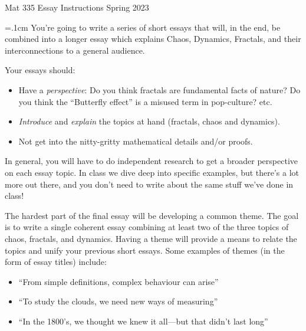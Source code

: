 \documentclass[12pt]{article}
\def\mydot{\textcolor{deepblue}{\rule{1ex}{1ex}}}
\newlength\sidebarwidth
\begin{document}
	{
		\begin{minipage}[t]{\textwidth}
			\color{myblue}\sc %
			{\huge Mat 335 Essay Instructions}
			\hfill Spring 2023

			\vspace{-8pt}
			\color{myblue}{\rule{\columnwidth}{3pt}}

			\vspace{.2cm}
		\end{minipage}
	}

	\vspace{.2cm}
	

	\small
	\hspace{\sidebarwidth}\begin{minipage}[t]{\textwidth - \sidebarwidth}
	{
		\parskip=.1cm
		You’re going to write a series of short essays that
		will, in the end, be combined into a longer essay
		which explains Chaos, Dynamics, Fractals, and their
		interconnections to a general audience.


		Your essays should:
		\vspace{-.4cm}
		\begin{itemize}[leftmargin=1cm, itemsep=0ex, parsep=.5ex, labelindent=-4ex, label={\mydot}]
			\item Have a \emph{perspective}: Do you think fractals are fundamental facts of nature? Do you think the “Butterfly effect” is a misused term in pop-culture? etc.
			\item \emph{Introduce} and \emph{explain} the topics at hand (fractals, chaos and dynamics).
			\item Not get into the nitty-gritty mathematical details and/or proofs.
		\end{itemize}
		In general, you will have to do independent research to
		get a broader perspective on each essay topic. In class we
		dive deep into specific examples, but there’s a lot more
		out there, and you don’t need to write about the same
		stuff we’ve done in class!

		The hardest part of the
		final essay will be developing a common theme. The goal
		is to write a single coherent essay combining at least two of the three topics of chaos, fractals,
		and dynamics. Having a theme will provide a means to
		relate the topics and unify your previous short essays. Some
		examples of themes (in the form of essay titles) include:
		\vspace{-.3cm}
		\begin{itemize}[leftmargin=1cm, itemsep=0ex, parsep=.5ex, labelindent=-4ex, label={\mydot}]
			\item “From simple definitions, complex behaviour can arise”
			\item “To study the clouds, we need new ways of measuring”
			\item “In the 1800’s, we thought we knew it all---but that didn’t last long”
		\end{itemize}
		
}
\end{minipage}
\end{document}
